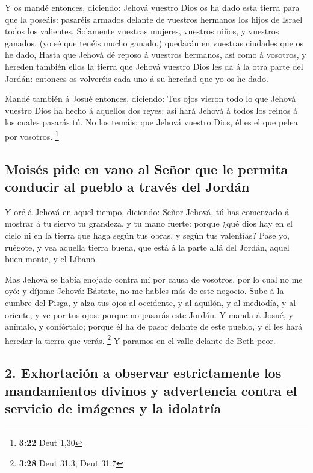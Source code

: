  Y os mandé entonces, diciendo: Jehová vuestro Dios os ha
dado esta tierra para que la poseáis: pasaréis armados delante de
vuestros hermanos los hijos de Israel todos los valientes. 
Solamente vuestras mujeres, vuestros niños, y vuestros ganados, (yo sé
que tenéis mucho ganado,) quedarán en vuestras ciudades que os he dado,
 Hasta que Jehová dé reposo á vuestros hermanos, así como á
vosotros, y hereden también ellos la tierra que Jehová vuestro Dios les
da á la otra parte del Jordán: entonces os volveréis cada uno á su
heredad que yo os he dado.

 Mandé también á Josué entonces, diciendo: Tus ojos vieron
todo lo que Jehová vuestro Dios ha hecho á aquellos dos reyes: así hará
Jehová á todos los reinos á los cuales pasarás tú.  No los
temáis; que Jehová vuestro Dios, él es el que pelea por vosotros.
\footnote{\textbf{3:22} Deut 1,30}

\hypertarget{moisuxe9s-pide-en-vano-al-seuxf1or-que-le-permita-conducir-al-pueblo-a-travuxe9s-del-jorduxe1n}{%
\subsection{Moisés pide en vano al Señor que le permita conducir al
pueblo a través del
Jordán}\label{moisuxe9s-pide-en-vano-al-seuxf1or-que-le-permita-conducir-al-pueblo-a-travuxe9s-del-jorduxe1n}}

 Y oré á Jehová en aquel tiempo, diciendo: 
Señor Jehová, tú has comenzado á mostrar á tu siervo tu grandeza, y tu
mano fuerte: porque ¿qué dios hay en el cielo ni en la tierra que haga
según tus obras, y según tus valentías?  Pase yo, ruégote,
y vea aquella tierra buena, que está á la parte allá del Jordán, aquel
buen monte, y el Líbano.

 Mas Jehová se había enojado contra mí por causa de
vosotros, por lo cual no me oyó: y díjome Jehová: Bástate, no me hables
más de este negocio.  Sube á la cumbre del Pisga, y alza
tus ojos al occidente, y al aquilón, y al mediodía, y al oriente, y ve
por tus ojos: porque no pasarás este Jordán.  Y manda á
Josué, y anímalo, y confórtalo; porque él ha de pasar delante de este
pueblo, y él les hará heredar la tierra que verás. \footnote{\textbf{3:28}
  Deut 31,3; Deut 31,7}  Y paramos en el valle delante de
Beth-peor.

\hypertarget{exhortaciuxf3n-a-observar-estrictamente-los-mandamientos-divinos-y-advertencia-contra-el-servicio-de-imuxe1genes-y-la-idolatruxeda}{%
\subsection{2. Exhortación a observar estrictamente los mandamientos
divinos y advertencia contra el servicio de imágenes y la
idolatría}\label{exhortaciuxf3n-a-observar-estrictamente-los-mandamientos-divinos-y-advertencia-contra-el-servicio-de-imuxe1genes-y-la-idolatruxeda}}

